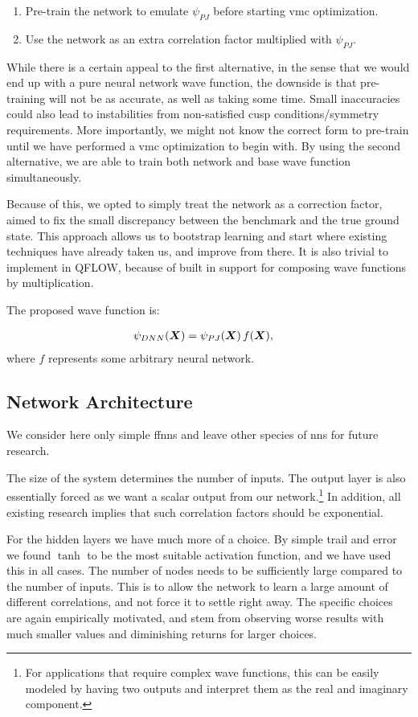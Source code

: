 \documentclass[Thesis.tex]{subfiles}
\begin{document}
\begin{enumerate}
\item Pre-train the network to emulate $\psi_{PJ}$ before starting \gls{vmc}
  optimization.
\item Use the network as an extra correlation factor multiplied with $\psi_{PJ}$.
\end{enumerate}
While there is a certain appeal to the first alternative, in the
sense that we would end up with a pure neural network wave function, the
downside is that pre-training will not be as accurate, as well as taking
some time. Small inaccuracies could also lead to instabilities from non-satisfied
cusp conditions/symmetry requirements. More importantly, we might
not know the correct form to pre-train until we have performed a \gls{vmc}
optimization to begin with. By using the second alternative, we are able to
train both network and base wave function simultaneously.

Because of this, we opted to simply treat the network as a correction factor,
aimed to fix the small discrepancy between the benchmark and the true ground
state. This approach allows us to bootstrap learning and start where existing
techniques have already taken us, and improve from there. It is also trivial to
implement in QFLOW, because of built in support for composing wave functions by
multiplication.

The proposed wave function is:

\begin{align}\label{eq:pade-dnn}
  \psi_{DNN}(\bm{X}) &= \psi_{PJ}(\bm{X})\, f(\bm{X}),
\end{align}
where $f$ represents some arbitrary neural network.


\subsection{Network Architecture}

We consider here only simple \glspl{ffnn} and leave other species of \glspl{nn} for
future research.

The size of the system determines the number of inputs.
The output layer is also essentially forced as we want a
scalar output from our network.\footnote{For applications that require complex
  wave functions, this can be easily modeled by having two outputs and
  interpret them as the real and imaginary component.} In addition, all
existing research implies that such correlation factors should be exponential.

For the hidden layers we have much more of a choice. By simple trail and error
we found $\tanh$ to be the most suitable activation function, and we have used this
in all cases. The number of nodes needs to be sufficiently large compared to the
number of inputs. This is to allow the network to learn a large amount of
different correlations, and not force it to settle right away.
The specific choices are again empirically motivated, and stem
from observing worse results with much smaller values and diminishing returns
for larger choices.
\end{document}

